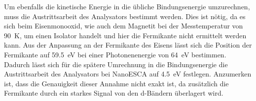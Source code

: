         Um ebenfalls die kinetische Energie in die übliche Bindungsenergie umzurechnen, muss die Austrittsarbeit des Analysators bestimmt werden.
        Dies ist nötig, da es sich beim Eisenmonooxid, wie auch dem Magnetit bei der Messtemperatur von \SI{90}{\kelvin}, um einen Isolator handelt und hier die Fermikante nicht ermittelt werden kann.
        Aus der Anpassung an der Fermikante des Eisens lässt sich die Position der Fermikante auf \SI{59.5}{\electronvolt} bei einer Photonenenergie von \SI{64}{\electronvolt} bestimmen.
        Dadurch lässt sich für die spätere Umrechnung in die Bindungsenergie die Austrittsarbeit des Analysators bei NanoESCA auf \SI{4.5}{\electronvolt} festlegen. 
        Anzumerken ist, dass die Genauigkeit dieser Annahme nicht exakt ist, da zusätzlich die Fermikante durch ein starkes Signal von den d-Bändern überlagert wird.

